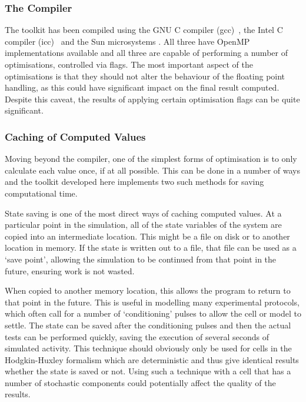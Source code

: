 \subsubsection{The Compiler}

The toolkit has been compiled using the GNU C compiler (gcc)~\cite{gcc}, the
Intel C compiler (icc)~\cite{icc} and the Sun microsystems .  All three have
OpenMP implementations available and all three are capable of performing a
number of optimisations, controlled via flags.  The most important aspect of the
optimisations is that they should not alter the behaviour of the floating point
handling, as this could have significant impact on the final result computed.
Despite this caveat, the results of applying certain optimisation flags can be
quite significant.

\subsubsection{Caching of Computed Values}

Moving beyond the compiler, one of the simplest forms of optimisation is to only
calculate each value once, if at all possible.  This can be done in a number of
ways and the toolkit developed here implements two such methods for saving
computational time.

State saving is one of the most direct ways of caching computed values.  At a
particular point in the simulation, all of the state variables of the
system are copied into an intermediate location.  This might be a file on disk or
to another location in memory.  If the state is written out to a file, that file can
be used as a `save point', allowing the simulation to be continued from that
point in the future, ensuring work is not wasted.

When copied to another memory location, this allows the program to return to
that point in the future.  This is useful in modelling many experimental
protocols, which often call for a number of `conditioning' pulses to allow the
cell or model to settle.  The state can be saved after the conditioning pulses
and then the actual tests can be performed quickly, saving the execution of
several seconds of simulated activity.  This technique should obviously only be
used for cells in the Hodgkin-Huxley formalism which are deterministic and thus
give identical results whether the state is saved or not.  Using such a
technique with a cell that has a number of stochastic components could
potentially affect the quality of the results.

